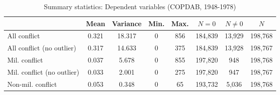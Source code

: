 \begin{table}[htbp]\centering\scriptsize
\caption{Summary statistics: Dependent variables (COPDAB, 1948-1978) \label{tab:summarystatsdv}}
\def\sym#1{\ifmmode^{#1}\else\(^{#1}\)\fi}
\begin{tabular}{l*{1}{ccccccc}}
\toprule
            &        Mean&         Variance&        Min.&         Max.& $N = 0$ & $N \neq 0$&       $N$\\
\midrule
All conflict&       0.321&      18.317&           0&         856& 184,839 & 13,929 &     198,768\\
All conflict (no outlier)&       0.317&      14.633&           0&         375&  184,839 & 13,928 &    198,767\\
Mil. conflict&       0.037&       5.678&           0&         855&  197,820 & 948  &  198,768\\
Mil. conflict (no outlier)&       0.033&       2.001&           0&         275& 197,820 & 947 &     198,767\\
Non-mil. conflict&       0.053&       0.348&           0&          65&   193,732 & 5,036&   198,768\\
\bottomrule
\end{tabular}
\end{table}
